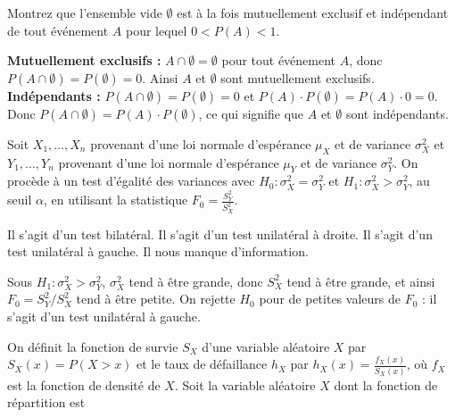 \begin{questions}

\pageblanche

\question[3]
Montrez que l'ensemble vide $\emptyset$ est à la fois mutuellement exclusif et indépendant de tout événement $A$ pour lequel $0<P(A)<1$.

\begin{solution}
\textbf{Mutuellement exclusifs :} $A\cap\emptyset=\emptyset$ pour tout événement $A$, donc $P(A\cap\emptyset)=P(\emptyset)=0$. Ainsi $A$ et $\emptyset$ sont mutuellement exclusifs. \\[4pt]
\textbf{Indépendants :} $P(A\cap\emptyset)=P(\emptyset)=0$ et $P(A)\cdot P(\emptyset)=P(A)\cdot 0=0$. Donc $P(A\cap\emptyset)=P(A)\cdot P(\emptyset)$, ce qui signifie que $A$ et $\emptyset$ sont indépendants.
\end{solution}

\vspace{4cm}





\question[3] Soit $X_1,\hdots,X_n$ provenant d'une loi normale d'espérance $\mu_X$ et de variance $\sigma^2_X$ et $Y_1,\hdots,Y_n$ provenant d'une loi normale d'espérance $\mu_Y$ et de variance $\sigma^2_Y$. On procède à un test d'égalité des variances avec $H_0:\sigma^2_X=\sigma^2_Y$ et $H_1:\sigma^2_X>\sigma^2_Y$, au seuil $\alpha$, en utilisant la statistique $\displaystyle F_0=\frac{S_Y^2}{S_X^2}$.

\begin{checkboxes}
    \choice Il s'agit d'un test bilatéral.
    \choice Il s'agit d'un test unilatéral à droite.
    \correctchoice Il s'agit d'un test unilatéral à gauche.
    \choice Il nous manque d'information.
\end{checkboxes}

\begin{solution}
Sous $H_1:\sigma^2_X>\sigma^2_Y$, $\sigma^2_X$ tend à être grande, donc $S_X^2$ tend à être grande, et ainsi $F_0=S_Y^2/S_X^2$ tend à être petite. On rejette $H_0$ pour de petites valeurs de $F_0$ : il s'agit d'un test unilatéral à gauche.
\end{solution}

\vspace{0.3cm}
\question[3] 
On définit la fonction de survie $S_X$ d'une variable aléatoire $X$ par $S_X(x)=P(X>x)$ et le taux de défaillance $h_X$ par $h_X(x)=\displaystyle\frac{f_X(x)}{S_X(x)}$, où $f_X$ est la fonction de densité de $X$.
Soit la variable aléatoire $X$ dont la fonction de répartition est


\end{questions}
